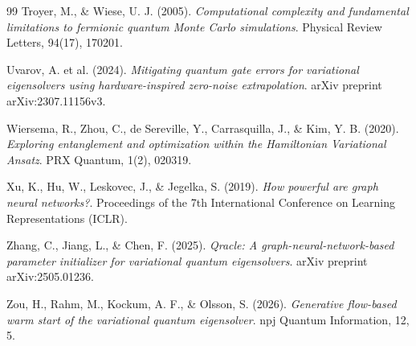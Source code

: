 \documentclass[11pt,a4paper,spanish]{book}
\begin{document}
\begin{thebibliography}{99}
 Troyer, M., \& Wiese, U. J. (2005). \emph{Computational complexity and fundamental limitations to fermionic quantum Monte Carlo simulations}. Physical Review Letters, 94(17), 170201.

 Uvarov, A. et al. (2024). \emph{Mitigating quantum gate errors for variational eigensolvers using hardware-inspired zero-noise extrapolation}. arXiv preprint arXiv:2307.11156v3.

 Wiersema, R., Zhou, C., de Sereville, Y., Carrasquilla, J., \& Kim, Y. B. (2020). \emph{Exploring entanglement and optimization within the Hamiltonian Variational Ansatz}. PRX Quantum, 1(2), 020319.

 Xu, K., Hu, W., Leskovec, J., \& Jegelka, S. (2019). \emph{How powerful are graph neural networks?}. Proceedings of the 7th International Conference on Learning Representations (ICLR).

 Zhang, C., Jiang, L., \& Chen, F. (2025). \emph{Qracle: A graph-neural-network-based parameter initializer for variational quantum eigensolvers}. arXiv preprint arXiv:2505.01236.

 Zou, H., Rahm, M., Kockum, A. F., \& Olsson, S. (2026). \emph{Generative flow-based warm start of the variational quantum eigensolver}. npj Quantum Information, 12, 5.

\end{thebibliography}
\end{document}
